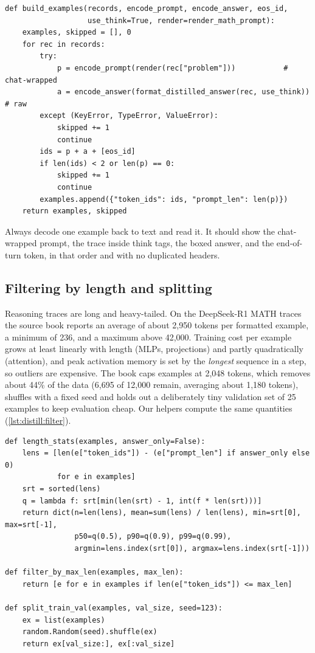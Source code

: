 \begin{lstlisting}[caption={Tokenising the dataset once (\texttt{llmsys/distill.py}).},
label={lst:distill:build}]
def build_examples(records, encode_prompt, encode_answer, eos_id,
                   use_think=True, render=render_math_prompt):
    examples, skipped = [], 0
    for rec in records:
        try:
            p = encode_prompt(render(rec["problem"]))           # chat-wrapped
            a = encode_answer(format_distilled_answer(rec, use_think))  # raw
        except (KeyError, TypeError, ValueError):
            skipped += 1
            continue
        ids = p + a + [eos_id]
        if len(ids) < 2 or len(p) == 0:
            skipped += 1
            continue
        examples.append({"token_ids": ids, "prompt_len": len(p)})
    return examples, skipped
\end{lstlisting}

Always decode one example back to text and read it. It should show the chat-wrapped prompt,
the trace inside think tags, the boxed answer, and the end-of-turn token, in that order and
with no duplicated headers.

\subsection{Filtering by length and splitting}\label{sec:distill:filter}

Reasoning traces are long and heavy-tailed. On the DeepSeek-R1 MATH traces the source book
reports an average of about 2{,}950 tokens per formatted example, a minimum of 236, and a
maximum above 42{,}000. Training cost per example grows at least linearly with length (MLPs,
projections) and partly quadratically (attention), and peak activation memory is set by the
\emph{longest} sequence in a step, so outliers are expensive. The book caps examples at 2{,}048
tokens, which removes about 44\% of the data (6{,}695 of 12{,}000 remain, averaging about 1{,}180
tokens), shuffles with a fixed seed and holds out a deliberately tiny validation set of 25
examples to keep evaluation cheap. Our helpers compute the same quantities
(\cref{lst:distill:filter}).

\begin{lstlisting}[caption={Length statistics, filtering and splitting.},label={lst:distill:filter}]
def length_stats(examples, answer_only=False):
    lens = [len(e["token_ids"]) - (e["prompt_len"] if answer_only else 0)
            for e in examples]
    srt = sorted(lens)
    q = lambda f: srt[min(len(srt) - 1, int(f * len(srt)))]
    return dict(n=len(lens), mean=sum(lens) / len(lens), min=srt[0], max=srt[-1],
                p50=q(0.5), p90=q(0.9), p99=q(0.99),
                argmin=lens.index(srt[0]), argmax=lens.index(srt[-1]))

def filter_by_max_len(examples, max_len):
    return [e for e in examples if len(e["token_ids"]) <= max_len]

def split_train_val(examples, val_size, seed=123):
    ex = list(examples)
    random.Random(seed).shuffle(ex)
    return ex[val_size:], ex[:val_size]
\end{lstlisting}

